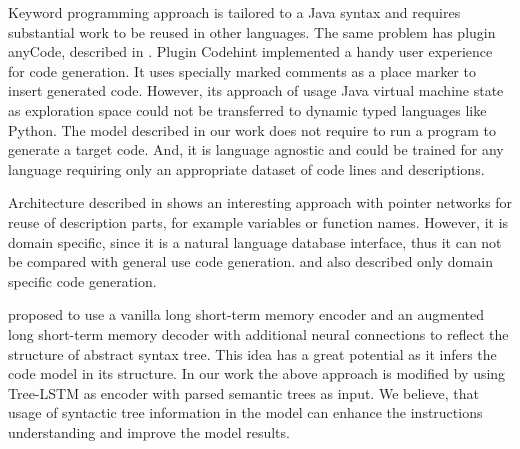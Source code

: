 Keyword programming approach \parencite{little2009keyword} is tailored to a Java syntax and requires substantial work to be reused in other languages. The same problem has plugin anyCode, described in \cite{Gvero2015}. Plugin Codehint \parencite{Galenson2014} implemented a handy user experience for code generation. It uses specially marked comments as a place marker to insert generated code. However, its approach of usage Java virtual machine state as exploration space could not be transferred to dynamic typed languages like Python. The model described in our work does not require to run a program to generate a target code. And, it is language agnostic and could be trained for any language requiring only an appropriate dataset of code lines and descriptions.

Architecture described in \cite{Zhong2017} shows an interesting approach with pointer networks for reuse of description parts, for example variables or function names. However, it is domain specific, since it is a natural language database interface, thus it can not be compared with general use code generation. \cite{Chen2016} and \cite{Ling2016} also described only domain specific code generation.

\cite{Yin2017} proposed to use a vanilla long short-term memory encoder and an augmented long short-term memory decoder with additional neural connections to reflect the structure of abstract syntax tree. This idea has a great potential as it infers the code model in its structure. In our work the above approach is modified by using Tree-LSTM as encoder with parsed semantic trees as input. We believe, that usage of syntactic tree information in the model can enhance the instructions understanding and improve the model results.

